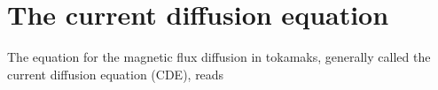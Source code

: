 \section{The current diffusion equation}

The equation for the magnetic flux diffusion in tokamaks, generally called
the current diffusion equation (CDE), reads \cite{CRONOSref}
\begin{equation}

\end{equation}
